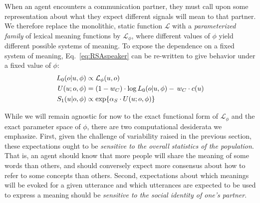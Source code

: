 When an agent encounters a communication partner, they must call upon some representation about what they expect different signals will mean to that partner. 
We therefore replace the monolithic, static function $\mathcal{L}$ with a \emph{parameterized family} of lexical meaning functions by $\mathcal{L}_{\phi}$, where different values of $\phi$ yield different possible systems of meaning. 
To expose the dependence on a fixed system of meaning, Eq.~\ref{eq:RSAspeaker} can be re-written to give behavior under a fixed value of $\phi$:
\begin{align}
L_0(o | u, \phi) &\propto  \mathcal{L}_\phi(u,o)\hfill\label{eq:RSA} \\
U(u; o, \phi) & = (1-w_C) \cdot \log L_0(o | u, \phi) -\, w_C \cdot c(u) \nonumber  \\
S_1(u | o,\phi) & \propto   \exp\{\alpha_S \cdot U(u; o, \phi)\} \nonumber 
\end{align}

While we will remain agnostic for now to the exact functional form of $\mathcal{L}_\phi$ and the exact parameter space of $\phi$, there are two computational desiderata we emphasize.
First, given the challenge of variability raised in the previous section, these expectations ought to be \emph{sensitive to the overall statistics of the population}. 
That is, an agent should know that more people will share the meaning of some words than others, and should conversely expect more consensus about how to refer to some concepts than others.
Second, expectations about which meanings will be evoked for a given utterance and which utterances are expected to be used to express a meaning should be \emph{sensitive to the social identity of one's partner}.%

